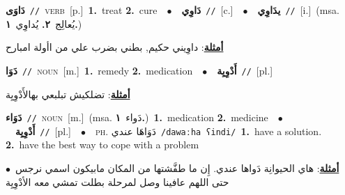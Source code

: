 \documentclass[10pt,a4paper,twoside]{article} %
\begin{document}
\begin{multicols}{2}
{\setlength\topsep{0pt}\textbf{\foreignlanguage{arabic}{دَاوَى}}\ {\color{gray}\texttt{//}\color{black}}\ \textsc{verb}\ [p.]\ \textbf{1.}~treat  \textbf{2.}~cure\ \ $\bullet$\ \ \setlength\topsep{0pt}\textbf{\foreignlanguage{arabic}{دَاوِي}}\ {\color{gray}\texttt{//}\color{black}}\ [c.]\ \ $\bullet$\ \ \setlength\topsep{0pt}\textbf{\foreignlanguage{arabic}{يدَاوِي}}\ {\color{gray}\texttt{//}\color{black}}\ [i.]\ \color{gray}(msa. \foreignlanguage{arabic}{يُعالِج}~\foreignlanguage{arabic}{\textbf{٢.}}  \foreignlanguage{arabic}{يُداوِي}~\foreignlanguage{arabic}{\textbf{١.}})\color{black}\  \begin{flushright}\color{gray}\foreignlanguage{arabic}{\textbf{\underline{\foreignlanguage{arabic}{أمثلة}}}: داوِيني حكيم, بطني بضرب علي من اأولة امبارح}\end{flushright}\color{black}} \vspace{2mm}

{\setlength\topsep{0pt}\textbf{\foreignlanguage{arabic}{دَوَا}}\ {\color{gray}\texttt{//}\color{black}}\ \textsc{noun}\ [m.]\ \textbf{1.}~remedy  \textbf{2.}~medication\ \ $\bullet$\ \ \setlength\topsep{0pt}\textbf{\foreignlanguage{arabic}{أَدْوِيِة}}\ {\color{gray}\texttt{//}\color{black}}\ [pl.]\  \begin{flushright}\color{gray}\foreignlanguage{arabic}{\textbf{\underline{\foreignlanguage{arabic}{أمثلة}}}: تضلكيش تبلبعي بهالأَدْوِيِة}\end{flushright}\color{black}} \vspace{2mm}

{\setlength\topsep{0pt}\textbf{\foreignlanguage{arabic}{دَوَاء}}\ {\color{gray}\texttt{//}\color{black}}\ \textsc{noun}\ [m.]\ \color{gray}(msa. \foreignlanguage{arabic}{دَواء}~\foreignlanguage{arabic}{\textbf{١.}})\color{black}\ \textbf{1.}~medication  \textbf{2.}~medicine\ \ $\bullet$\ \ \setlength\topsep{0pt}\textbf{\foreignlanguage{arabic}{أَدْوِيِة}}\ {\color{gray}\texttt{//}\color{black}}\ [pl.]\ \ $\bullet$\ \ \textsc{ph.} \color{gray} \foreignlanguage{arabic}{دَوَاهَا عندي}\color{black}\ {\color{gray}\texttt{/{\sffamily dawaːha ʕindi}/}\color{black}}\ \textbf{1.}~have a solution.  \textbf{2.}~have the best way to cope with a problem\  \begin{flushright}\color{gray}\foreignlanguage{arabic}{\textbf{\underline{\foreignlanguage{arabic}{أمثلة}}}: هاي الحيوانِة دَواها عندي. إِن ما طفَّشتها من المكان مابيكون اسمي نرجس\ $\bullet$\ \  حتى اللهم عافينا وصل لمرحلة بطلت تمشي معه الأدْوِيِة}\end{flushright}\color{black}} \vspace{2mm}


\end{multicols}
\end{document}
